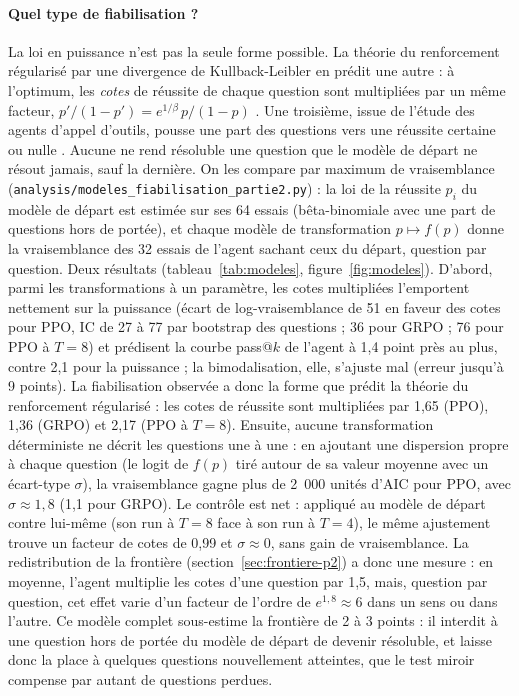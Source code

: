 \documentclass[11pt,a4paper]{article}
\begin{document}
\paragraph{Quel type de fiabilisation ?} La loi en puissance n'est pas la seule forme possible. La théorie du renforcement régularisé par une divergence de Kullback-Leibler en prédit une autre : à l'optimum, les \emph{cotes} de réussite de chaque question sont multipliées par un même facteur, $p'/(1-p') = e^{1/\beta}\,p/(1-p)$ \citep[annexe B]{matrenok2026controlling}. Une troisième, issue de l'étude des agents d'appel d'outils, pousse une part des questions vers une réussite certaine ou nulle \citep[théorème 2]{oh2026sharpening}. Aucune ne rend résoluble une question que le modèle de départ ne résout jamais, sauf la dernière. On les compare par maximum de vraisemblance (\texttt{analysis/modeles\_fiabilisation\_partie2.py}) : la loi de la réussite $p_i$ du modèle de départ est estimée sur ses 64 essais (bêta-binomiale avec une part de questions hors de portée), et chaque modèle de transformation $p \mapsto f(p)$ donne la vraisemblance des 32 essais de l'agent sachant ceux du départ, question par question. Deux résultats (tableau~\ref{tab:modeles}, figure~\ref{fig:modeles}). D'abord, parmi les transformations à un paramètre, les cotes multipliées l'emportent nettement sur la puissance (écart de log-vraisemblance de 51 en faveur des cotes pour PPO, IC de 27 à 77 par bootstrap des questions ; 36 pour GRPO ; 76 pour PPO à $T = 8$) et prédisent la courbe pass@$k$ de l'agent à 1,4 point près au plus, contre 2,1 pour la puissance ; la bimodalisation, elle, s'ajuste mal (erreur jusqu'à 9 points). La fiabilisation observée a donc la forme que prédit la théorie du renforcement régularisé : les cotes de réussite sont multipliées par 1,65 (PPO), 1,36 (GRPO) et 2,17 (PPO à $T = 8$). Ensuite, aucune transformation déterministe ne décrit les questions une à une : en ajoutant une dispersion propre à chaque question (le logit de $f(p)$ tiré autour de sa valeur moyenne avec un écart-type $\sigma$), la vraisemblance gagne plus de 2~000 unités d'AIC pour PPO, avec $\sigma \approx 1{,}8$ (1,1 pour GRPO). Le contrôle est net : appliqué au modèle de départ contre lui-même (son run à $T = 8$ face à son run à $T = 4$), le même ajustement trouve un facteur de cotes de 0,99 et $\sigma \approx 0$, sans gain de vraisemblance. La redistribution de la frontière (section~\ref{sec:frontiere-p2}) a donc une mesure : en moyenne, l'agent multiplie les cotes d'une question par 1,5, mais, question par question, cet effet varie d'un facteur de l'ordre de $e^{1{,}8} \approx 6$ dans un sens ou dans l'autre. Ce modèle complet sous-estime la frontière de 2 à 3 points : il interdit à une question hors de portée du modèle de départ de devenir résoluble, et laisse donc la place à quelques questions nouvellement atteintes, que le test miroir compense par autant de questions perdues.
\end{document}
